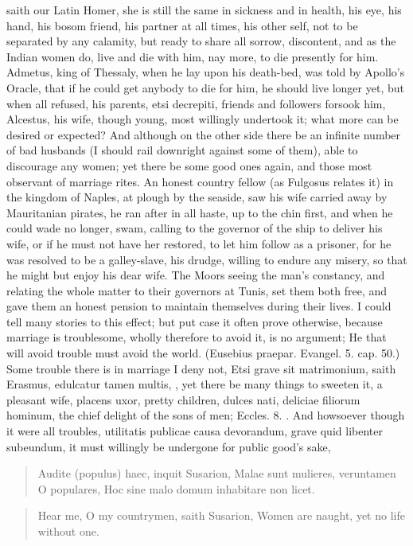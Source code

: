 saith our Latin Homer, she is still the same in sickness and in health,
his eye, his hand, his bosom friend, his partner at all times, his
other self, not to be separated by any calamity, but ready to share all
sorrow, discontent, and as the Indian women do, live and die with him,
nay more, to die presently for him. Admetus, king of Thessaly, when he
lay upon his death-bed, was told by Apollo's Oracle, that if he could
get anybody to die for him, he should live longer yet, but when all
refused, his parents, etsi decrepiti, friends and followers forsook
him, Alcestus, his wife, though young, most willingly undertook it;
what more can be desired or expected? And although on the other side
there be an infinite number of bad husbands (I should rail downright
against some of them), able to discourage any women; yet there be some
good ones again, and those most observant of marriage rites. An honest
country fellow (as Fulgosus relates it) in the kingdom of Naples,
at plough by the seaside, saw his wife carried away by
Mauritanian pirates, he ran after in all haste, up to the chin first,
and when he could wade no longer, swam, calling to the governor of the
ship to deliver his wife, or if he must not have her restored, to let
him follow as a prisoner, for he was resolved to be a galley-slave, his
drudge, willing to endure any misery, so that he might but enjoy his
dear wife. The Moors seeing the man's constancy, and relating the whole
matter to their governors at Tunis, set them both free, and gave them
an honest pension to maintain themselves during their lives. I could
tell many stories to this effect; but put case it often prove
otherwise, because marriage is troublesome, wholly therefore to avoid
it, is no argument; He that will avoid trouble must avoid the
world. (Eusebius praepar. Evangel. 5. cap. 50.) Some trouble there is
in marriage I deny not, Etsi grave sit matrimonium, saith Erasmus,
edulcatur tamen multis, \etc{}, yet there be many things to sweeten
it, a pleasant wife, placens uxor, pretty children, dulces nati,
deliciae filiorum hominum, the chief delight of the sons of men;
Eccles.  8. \etc{}. And howsoever though it were all troubles,
utilitatis publicae causa devorandum, grave quid libenter
subeundum, it must willingly be undergone for public good's sake,

\begin{latin}
\begin{verse}
Audite (populus) haec, inquit Susarion,
Malae sunt mulieres, veruntamen O populares,
Hoc sine malo domum inhabitare non licet.
\end{verse}
\end{latin}
\translationrule%
\begin{verse}%
Hear me, O my countrymen, saith Susarion,
Women are naught, yet no life without one.
\end{verse}%


